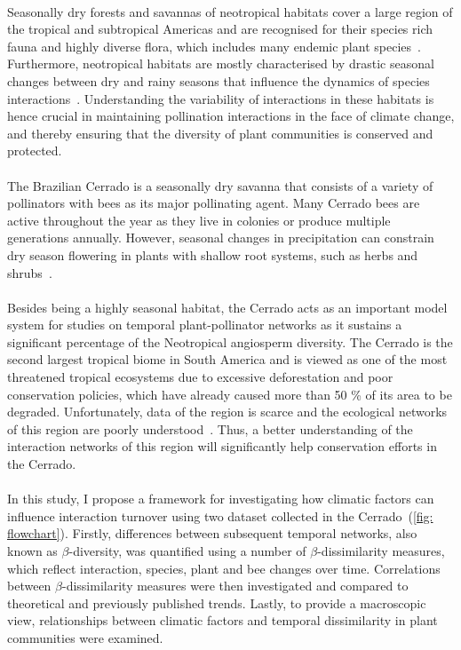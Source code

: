 \documentclass[11pt]{article}
\begin{document}
\\
Seasonally dry forests and savannas of neotropical habitats cover a large region of the tropical and subtropical Americas and are recognised for their species rich fauna and highly diverse flora, which includes many endemic plant species~\citep{Myers2000, KLINK2005, Pennington2006}. Furthermore, neotropical habitats are mostly characterised by drastic seasonal changes between dry and rainy seasons that influence the dynamics of species interactions~\citep{Kricher2011}. Understanding the variability of interactions in these habitats is hence crucial in maintaining pollination interactions in the face of climate change, and thereby ensuring that the diversity of plant communities is conserved and protected. \\
\\
The Brazilian Cerrado is a seasonally dry savanna that consists of a variety of pollinators with bees as its major pollinating agent. Many Cerrado bees are active throughout the year as they live in colonies or produce multiple generations annually. However, seasonal changes in precipitation can constrain dry season flowering in plants with shallow root systems, such as herbs and shrubs~\citep{Gibbs2002, TobyPennington2006, Gottsberger2006}. \\
\\
Besides being a highly seasonal habitat, the Cerrado acts as an important model system for studies on temporal plant-pollinator networks as it sustains a significant percentage of the Neotropical angiosperm diversity. The Cerrado is the second largest tropical biome in South America and is viewed as one of the most threatened tropical ecosystems due to excessive deforestation and poor conservation policies, which have already caused more than 50 \% of its area to be degraded. Unfortunately, data of the region is scarce and the ecological networks of this region are poorly understood~\citep{Myers2000, KLINK2005}. Thus, a better understanding of the interaction networks of this region will significantly help conservation efforts in the Cerrado.\\
\\
In this study, I propose a framework for investigating how climatic factors can influence interaction turnover using two dataset collected in the Cerrado~(\autoref{fig: flowchart}). Firstly, differences between subsequent temporal networks, also known as $\beta$-diversity, was quantified using a number of $\beta$-dissimilarity measures, which reflect interaction, species, plant and bee changes over time. Correlations between $\beta$-dissimilarity measures were then investigated and compared to theoretical and previously published trends. Lastly, to provide a macroscopic view, relationships between climatic factors and temporal dissimilarity in plant communities were examined.
\end{document}
